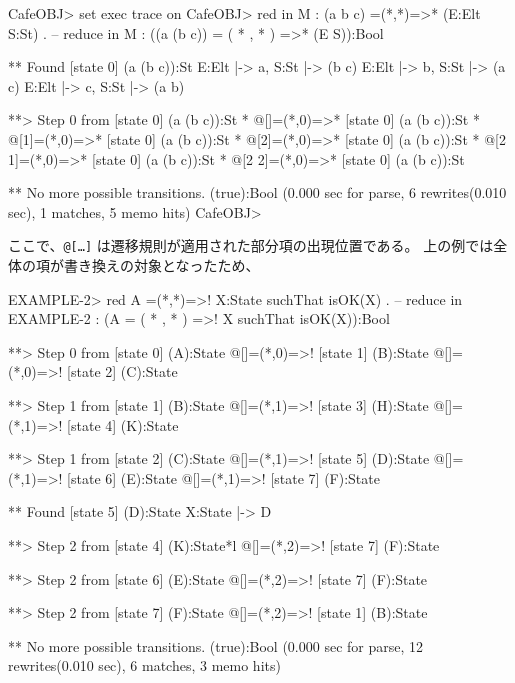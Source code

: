 \documentclass{article}
\begin{document}
\begin{simplev}
CafeOBJ> set exec trace on
CafeOBJ> red in M : (a b c) =(*,*)=>* (E:Elt S:St) .
-- reduce in M : ((a (b c)) = ( * , * ) =>* (E S)):Bool

** Found [state 0] (a (b c)):St
   { E:Elt |-> a, S:St |-> (b c) }
   { E:Elt |-> b, S:St |-> (a c) }
   { E:Elt |-> c, S:St |-> (a b) }


**> Step 0 from [state 0] (a (b c)):St *
@[]=(*,0)=>* [state 0] (a (b c)):St *
@[1]=(*,0)=>* [state 0] (a (b c)):St *
@[2]=(*,0)=>* [state 0] (a (b c)):St *
@[2 1]=(*,0)=>* [state 0] (a (b c)):St *
@[2 2]=(*,0)=>* [state 0] (a (b c)):St

** No more possible transitions.
(true):Bool
(0.000 sec for parse, 6 rewrites(0.010 sec), 1 matches, 5 memo hits)
CafeOBJ> 
\end{simplev}
ここで、\texttt{@[\ldots]} は遷移規則が適用された部分項の出現位置である。
上の例では全体の項が書き換えの対象となったため、

\begin{simplev}
EXAMPLE-2> red A =(*,*)=>! X:State suchThat isOK(X) .
-- reduce in EXAMPLE-2 : (A = ( * , * ) =>! X suchThat isOK(X)):Bool

**> Step 0 from [state 0] (A):State
@[]=(*,0)=>! [state 1] (B):State
@[]=(*,0)=>! [state 2] (C):State

**> Step 1 from [state 1] (B):State
@[]=(*,1)=>! [state 3] (H):State
@[]=(*,1)=>! [state 4] (K):State

**> Step 1 from [state 2] (C):State
@[]=(*,1)=>! [state 5] (D):State
@[]=(*,1)=>! [state 6] (E):State
@[]=(*,1)=>! [state 7] (F):State

** Found [state 5] (D):State
   { X:State |-> D }


**> Step 2 from [state 4] (K):State*l
@[]=(*,2)=>! [state 7] (F):State

**> Step 2 from [state 6] (E):State
@[]=(*,2)=>! [state 7] (F):State

**> Step 2 from [state 7] (F):State
@[]=(*,2)=>! [state 1] (B):State

** No more possible transitions.
(true):Bool
(0.000 sec for parse, 12 rewrites(0.010 sec), 6 matches, 3 memo hits)
\end{simplev}
\end{document}
